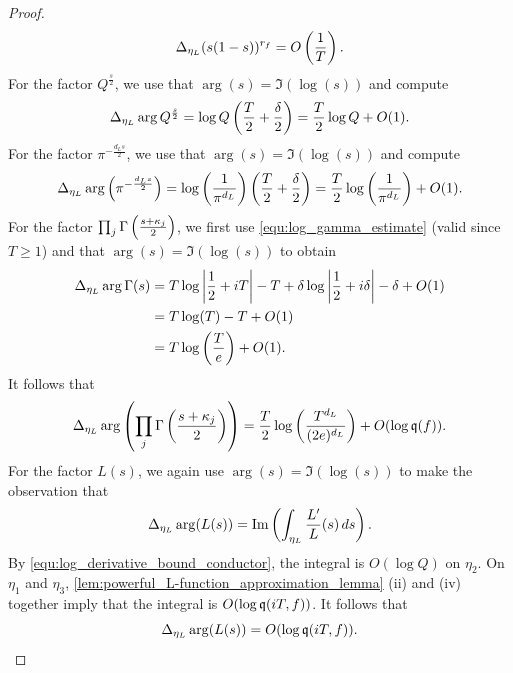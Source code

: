 \documentclass[12pt]{article}
\begin{document}
\begin{proof}
      \begin{equation}\label{equ:zero_counting_1}
        \Delta_{\eta_{L}}(s(1-s))^{r_{f}} = O\left(\frac{1}{T}\right).
      \end{equation}
      For the factor \(Q^{\frac{s}{2}}\), we use that \(\arg(s) = \Im(\log(s))\) and compute
      \begin{equation}\label{equ:zero_counting_2}
        \Delta_{\eta_{L}}\arg{Q^{\frac{s}{2}}} = \log{Q}\left(\frac{T}{2}+\frac{\delta}{2}\right) = \frac{T}{2}\log{Q}+O(1).
      \end{equation}
      For the factor \(\pi^{-\frac{d_{L}s}{2}}\), we use that \(\arg(s) = \Im(\log(s))\) and compute
      \begin{equation}\label{equ:zero_counting_3}
        \Delta_{\eta_{L}}\arg\left(\pi^{-\frac{d_{L}s}{2}}\right) = \log\left(\frac{1}{\pi^{d_{L}}}\right)\left(\frac{T}{2}+\frac{\delta}{2}\right) = \frac{T}{2}\log\left(\frac{1}{\pi^{d_{L}}}\right)+O(1).
      \end{equation}
      For the factor \(\prod_{j}\Gamma\left(\frac{s+\kappa_{j}}{2}\right)\), we first use \cref{equ:log_gamma_estimate} (valid since \(T \ge 1\)) and that \(\arg(s) = \Im(\log(s))\) to obtain
      \begin{align*}
        \Delta_{\eta_{L}}\arg\Gamma(s) &= T\log\left|\frac{1}{2}+iT\right|-T+\delta\log\left|\frac{1}{2}+i\delta\right|-\delta+O(1) \\
        &= T\log(T)-T+O(1) \\
        &= T\log\left(\frac{T}{e}\right)+O(1).
      \end{align*}
      It follows that
      \begin{equation}\label{equ:zero_counting_4}
        \Delta_{\eta_{L}}\arg\left(\prod_{j}\Gamma\left(\frac{s+\kappa_{j}}{2}\right)\right) = \frac{T}{2}\log\left(\frac{T^{d_{L}}}{(2e)^{d_{L}}}\right)+O(\log{\mathfrak{q}(f)}).
      \end{equation}
      For the factor \(L(s)\), we again use \(\arg(s) = \Im(\log(s))\) to make the observation that
      \[
        \Delta_{\eta_{L}}\arg(L(s)) = \mathrm{Im}\left(\int_{\eta_{L}}\frac{L'}{L}(s)\,ds\right).
      \]
      By \cref{equ:log_derivative_bound_conductor}, the integral is \(O(\log{Q})\) on \(\eta_{2}\). On \(\eta_{1}\) and \(\eta_{3}\), \cref{lem:powerful_L-function_approximation_lemma} (ii) and (iv) together imply that the integral is \(O(\log{\mathfrak{q}(iT,f)})\). It follows that
      \begin{equation}\label{equ:zero_counting_5}
        \Delta_{\eta_{L}}\arg(L(s)) = O(\log{\mathfrak{q}(iT,f)}).
      \end{equation}

\end{proof}
\end{document}
